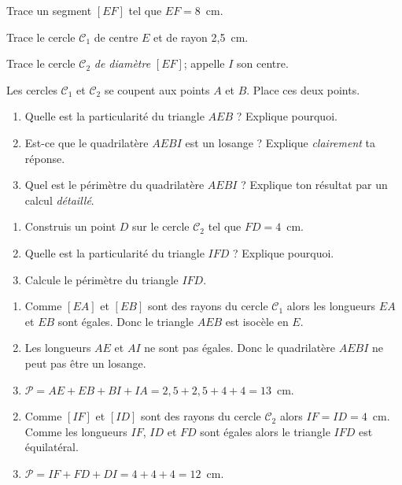 \begin{myenumerate}
  \item Trace un segment $[EF]$ tel que $EF=8$~cm.
  \item Trace le cercle ${\mathscr C}_1$ de centre $E$ et de rayon 2,5~cm.
  \item Trace le cercle ${\mathscr C}_2$ {\em de diamètre} $[EF]$; appelle $I$ son centre.
  \item Les cercles ${\mathscr C}_1$ et ${\mathscr C}_2$ se coupent aux points $A$ et $B$. Place ces deux points.
  \item
    \begin{enumerate}
    \item Quelle est la particularité du triangle $AEB$ ? Explique
      pourquoi.
    \item Est-ce que le quadrilatère $AEBI$ est un losange ? Explique
      {\em clairement} ta réponse.
    \item Quel est le périmètre du quadrilatère $AEBI$ ? Explique ton
      résultat par un calcul {\em détaillé}.
    \end{enumerate}
  \item
    \begin{enumerate}
      \item Construis un point $D$ sur le cercle ${\mathscr C}_2$ tel que $FD=4$~cm.
      \item Quelle est la particularité du triangle $IFD$ ? Explique
        pourquoi.
      \item Calcule le périmètre du triangle $IFD$.
    \end{enumerate}    
\end{myenumerate}
\begin{myenumerate}
  \setcounter{enumi}{4}
  \item
    \begin{enumerate}
    \item Comme $[EA]$ et $[EB]$ sont des rayons du cercle ${\mathscr
        C}_1$ alors les longueurs $EA$ et $EB$ sont égales. Donc le
      triangle $AEB$ est isocèle en $E$.
    \item Les longueurs $AE$ et $AI$ ne sont pas égales. Donc le
      quadrilatère $AEBI$ ne peut pas être un losange.
    \item ${\mathscr P}=AE+EB+BI+IA=2,5+2,5+4+4=13$~cm.
    \end{enumerate}
  \item
    \begin{enumerate}
      \setcounter{enumii}{1}
    \item Comme $[IF]$ et $[ID]$ sont des rayons du cercle ${\mathscr
        C}_2$ alors $IF=ID=4$~cm.\\ Comme les longueurs $IF$, $ID$ et
      $FD$ sont égales alors le triangle $IFD$ est équilatéral.
    \item ${\mathscr P}=IF+FD+DI=4+4+4=12$~cm.
    \end{enumerate}
\end{myenumerate}